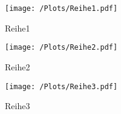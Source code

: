 \begin{figure}
  \centering
  \texttt{[image: /Plots/Reihe1.pdf]}
  \caption{Reihe1}
  \label{fig:Reihe1}
\end{figure}

\begin{figure}
  \centering
  \texttt{[image: /Plots/Reihe2.pdf]}
  \caption{Reihe2}
  \label{fig:Reihe2}
\end{figure}

\begin{figure}
  \centering
  \texttt{[image: /Plots/Reihe3.pdf]}
  \caption{Reihe3}
  \label{fig:Reihe3}
\end{figure}

